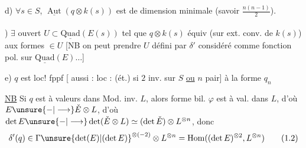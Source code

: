 d) $\forall s\in S$, $\underline{\operatorname{Aut}}(q\otimes k(s))$ est de dimension minimale (savoir $\frac{n(n-1)}{2}$).

)  $\exists$ ouvert \deleted{$\unsure{\varnothing\ne}$} $U\subset\underline{\mathrm{Quad}}(E(s))$ tel que $q\otimes k(s)$ équiv\textsuperscript{} (sur ext. conv. de $k(s)$) aux formes $\in U$ [NB on peut prendre $U$ défini par $\delta'$ considéré comme fonction pol. sur $\underline{\mathrm{Quad}}(E)\ldots$]

e) $q$ est  loc! fppf [ aussi : loc : (ét.) si $2$ inv. sur $S$ \uline{ou} $n$ pair] à la forme  $q_n$

\uline{NB} Si $q$ est à valeurs dans Mod. inv. $L$, alors forme bil.  $\varphi$ est à val. dans $L$, d'où $E\unsure{-|\longrightarrow}\check E\otimes L$, d'où $\det E\unsure{-|\longrightarrow}\det(\check E\otimes L)\simeq(\det\check E)\otimes L^{\otimes n}$, donc
\[
\delta'(q)\in\Gamma{\unsure{\det(E)|(\det E)}}^{\otimes(-2)}\otimes L^{\otimes n}=\operatorname{Hom}((\det E)^{\otimes2},L^{\otimes n})\tag*{(1.2)}
\]
